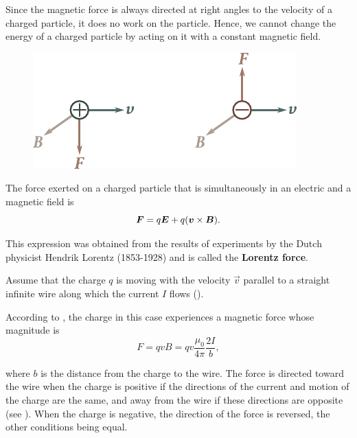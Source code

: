 Since the magnetic force is always directed at right angles to the velocity of a charged particle, it does no work on the particle. Hence, we cannot change the energy of a charged particle by acting on it with a constant magnetic field.

\begin{figure}[t]
	\begin{center}
		\includegraphics[scale=1]{figures/ch_06/fig_6_6.pdf}
		\caption[]{}
		\label{fig:6_6}
	\end{center}
	\vspace{-0.8cm}
\end{figure}

The force exerted on a charged particle that is simultaneously in an electric and a magnetic field is
\begin{equation}\label{eq:6_35}
    \boldsymbol{F} = q \boldsymbol{E} + q (\boldsymbol{v}\times\boldsymbol{B}).
\end{equation}

\noindent
This expression was obtained from the results of experiments by the Dutch physicist Hendrik Lorentz (1853-1928) and is called the \textbf{Lorentz force}.

Assume that the charge $q$ is moving with the velocity $\vec{v}$ parallel to a straight infinite wire along which the current $I$ flows ().

According to , the charge in this case experiences a magnetic force whose magnitude is
\begin{equation}\label{eq:6_36}
    F = qvB = qv \frac{\mu_0}{4\pi} \frac{2I}{b},
\end{equation}

\noindent
where $b$ is the distance from the charge to the wire. The force is directed toward the wire when the charge is positive if the directions of the current and motion of the charge are the same, and away from the wire if these directions are opposite (see ). When the charge is negative, the direction of the force is reversed, the other conditions being equal.

